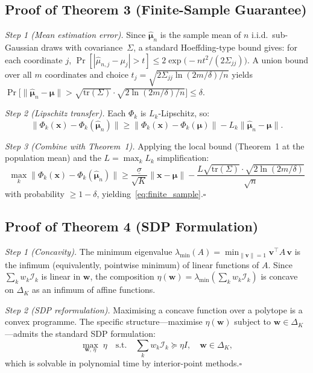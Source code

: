 \documentclass[journal]{IEEEtran}
\begin{document}
\subsection{Proof of Theorem 3 (Finite-Sample Guarantee)}

\textit{Step 1 (Mean estimation error).}
Since $\hat{\boldsymbol{\mu}}_n$ is the sample mean of $n$ i.i.d.\ sub-Gaussian draws with covariance~$\Sigma$, a standard Hoeffding-type bound gives: for each coordinate $j$,
$\Pr[|\hat{\mu}_{n,j}-\mu_j|>t]\leq 2\exp\!\bigl(-nt^2/(2\Sigma_{jj})\bigr)$.
A union bound over all $m$ coordinates and choice $t_j=\sqrt{2\Sigma_{jj}\ln(2m/\delta)/n}$ yields
$\Pr\!\bigl[\|\hat{\boldsymbol{\mu}}_n-\boldsymbol{\mu}\|>\sqrt{\mathrm{tr}(\Sigma)}\cdot\sqrt{2\ln(2m/\delta)/n}\bigr]\leq\delta$.

\textit{Step 2 (Lipschitz transfer).}
Each $\Phi_k$ is $L_k$-Lipschitz, so:
\[
\|\Phi_k(\mathbf{x})-\Phi_k(\hat{\boldsymbol{\mu}}_n)\| \geq \|\Phi_k(\mathbf{x})-\Phi_k(\boldsymbol{\mu})\| - L_k\|\hat{\boldsymbol{\mu}}_n-\boldsymbol{\mu}\|.
\]

\textit{Step 3 (Combine with Theorem~1).}
Applying the local bound (Theorem~1 at the population mean) and the $L=\max_k L_k$ simplification:
\[
\max_k\|\Phi_k(\mathbf{x})-\Phi_k(\hat{\boldsymbol{\mu}}_n)\| \geq \frac{\underline{\sigma}}{\sqrt{K}}\|\mathbf{x}-\boldsymbol{\mu}\| - \frac{L\sqrt{\mathrm{tr}(\Sigma)}\cdot\sqrt{2\ln(2m/\delta)}}{\sqrt{n}}
\]
with probability $\geq 1-\delta$, yielding~\eqref{eq:finite_sample}.\hfill$\square$

\subsection{Proof of Theorem 4 (SDP Formulation)}

\textit{Step 1 (Concavity).}
The minimum eigenvalue $\lambda_{\min}(A)=\min_{\|\mathbf{v}\|=1}\mathbf{v}^\top A\,\mathbf{v}$ is the infimum (equivalently, pointwise minimum) of linear functions of $A$.  Since $\sum_k w_k\mathcal{I}_k$ is linear in $\mathbf{w}$, the composition $\eta(\mathbf{w})=\lambda_{\min}(\sum_k w_k\mathcal{I}_k)$ is concave on $\Delta_K$ as an infimum of affine functions.

\textit{Step 2 (SDP reformulation).}
Maximising a concave function over a polytope is a convex programme.  The specific structure---maximise $\eta(\mathbf{w})$ subject to $\mathbf{w}\in\Delta_K$---admits the standard SDP formulation:
\[
\max_{\mathbf{w},\,\eta}\;\eta \quad\text{s.t.}\quad \textstyle\sum_k w_k\mathcal{I}_k \succeq \eta I,\quad \mathbf{w}\in\Delta_K,
\]
which is solvable in polynomial time by interior-point methods.\hfill$\square$
\end{document}
